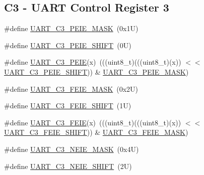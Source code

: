 \subsection*{C3 -\/ U\+A\+RT Control Register 3}
\begin{DoxyCompactItemize}
\item 
\#define \mbox{\hyperlink{group___u_a_r_t___register___masks_gadf1ad2301848b5812b84658d02cc2006}{U\+A\+R\+T\+\_\+\+C3\+\_\+\+P\+E\+I\+E\+\_\+\+M\+A\+SK}}~(0x1\+U)
\item 
\#define \mbox{\hyperlink{group___u_a_r_t___register___masks_gad14f9faaee56b818a04794694960fa6a}{U\+A\+R\+T\+\_\+\+C3\+\_\+\+P\+E\+I\+E\+\_\+\+S\+H\+I\+FT}}~(0\+U)
\item 
\#define \mbox{\hyperlink{group___u_a_r_t___register___masks_gab96d251fa95f8fdd25ae55374c23f698}{U\+A\+R\+T\+\_\+\+C3\+\_\+\+P\+E\+IE}}(x)~(((uint8\+\_\+t)(((uint8\+\_\+t)(x)) $<$$<$ \mbox{\hyperlink{group___u_a_r_t___register___masks_gad14f9faaee56b818a04794694960fa6a}{U\+A\+R\+T\+\_\+\+C3\+\_\+\+P\+E\+I\+E\+\_\+\+S\+H\+I\+FT}})) \& \mbox{\hyperlink{group___u_a_r_t___register___masks_gadf1ad2301848b5812b84658d02cc2006}{U\+A\+R\+T\+\_\+\+C3\+\_\+\+P\+E\+I\+E\+\_\+\+M\+A\+SK}})
\item 
\#define \mbox{\hyperlink{group___u_a_r_t___register___masks_gaf165d0ae5fd464a2ec367e29d1dedcb2}{U\+A\+R\+T\+\_\+\+C3\+\_\+\+F\+E\+I\+E\+\_\+\+M\+A\+SK}}~(0x2\+U)
\item 
\#define \mbox{\hyperlink{group___u_a_r_t___register___masks_gac08e14a1c915cfa377176fc6d491e38d}{U\+A\+R\+T\+\_\+\+C3\+\_\+\+F\+E\+I\+E\+\_\+\+S\+H\+I\+FT}}~(1\+U)
\item 
\#define \mbox{\hyperlink{group___u_a_r_t___register___masks_gae7d1ccc17fbd5c274fd85b1e8dca26c3}{U\+A\+R\+T\+\_\+\+C3\+\_\+\+F\+E\+IE}}(x)~(((uint8\+\_\+t)(((uint8\+\_\+t)(x)) $<$$<$ \mbox{\hyperlink{group___u_a_r_t___register___masks_gac08e14a1c915cfa377176fc6d491e38d}{U\+A\+R\+T\+\_\+\+C3\+\_\+\+F\+E\+I\+E\+\_\+\+S\+H\+I\+FT}})) \& \mbox{\hyperlink{group___u_a_r_t___register___masks_gaf165d0ae5fd464a2ec367e29d1dedcb2}{U\+A\+R\+T\+\_\+\+C3\+\_\+\+F\+E\+I\+E\+\_\+\+M\+A\+SK}})
\item 
\#define \mbox{\hyperlink{group___u_a_r_t___register___masks_ga1e485aea10f0176919ae060d0ee1d709}{U\+A\+R\+T\+\_\+\+C3\+\_\+\+N\+E\+I\+E\+\_\+\+M\+A\+SK}}~(0x4\+U)
\item 
\#define \mbox{\hyperlink{group___u_a_r_t___register___masks_gae70ab8b995df889314915948d51ae783}{U\+A\+R\+T\+\_\+\+C3\+\_\+\+N\+E\+I\+E\+\_\+\+S\+H\+I\+FT}}~(2\+U)
\item 

\end{DoxyCompactItemize}

